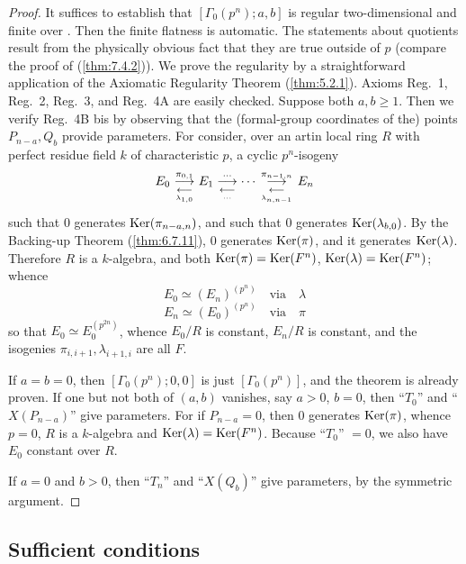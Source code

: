 \begin{proof}
It suffices to establish that $[\Gamma_0(p^n); a, b]$ is regular two-dimensional and finite over \Ell. Then the finite flatness is automatic. The statements about quotients result from the physically obvious fact that they are true outside of $p$ (compare the proof of (\ref{thm:7.4.2})). We prove the regularity by a straightforward application of the Axiomatic Regularity Theorem (\ref{thm:5.2.1}). Axioms Reg.~1, Reg.~2, Reg.~3, and Reg.~4A are easily checked. Suppose both $a, b \geq 1$. Then we verify Reg.~4B bis by observing that the (formal-group coordinates of the) points $P_{n-a}, Q_b$ provide parameters. For consider, over an artin local ring $R$ with perfect residue field $k$ of characteristic $p$, a cyclic $p^n$-isogeny
\[
E_0 \mathrel{ \mathop{\overset{\,\pi_{0,1}\,}{\longrightarrow}} \limits_{\underset{\,\lambda_{1,0}\,}{\longleftarrow}} } E_1 \mathrel{ \mathop{\overset{\,\cdots\,}{\longrightarrow}} \limits_{\underset{\,\cdots\,}{\longleftarrow}} } \cdots \mathrel{ \mathop{\overset{\,\pi_{n-1,n}\,}{\longrightarrow}} \limits_{\underset{\,\lambda_{n,n-1}\,}{\longleftarrow}} } E_n
\]
such that $0$ generates $\operatorname{Ker}(\pi_{n-a,n})$, and such that $0$ generates $\operatorname{Ker}(\lambda_{b,0})$. By the Backing-up Theorem (\ref{thm:6.7.11}), $0$ generates $\operatorname{Ker}(\pi)$, and it generates $\operatorname{Ker}(\lambda)$. Therefore $R$ is a $k$-algebra, and both $\operatorname{Ker}(\pi) = \operatorname{Ker}(F^n)$, $\operatorname{Ker}(\lambda) = \operatorname{Ker}(F^n)$; whence
\[
E_0 \simeq (E_n)^{(p^n)} \quad \text{via} \quad \lambda
\]
\[
E_n \simeq (E_0)^{(p^n)} \quad \text{via} \quad \pi
\]
so that $E_0 \simeq E_0^{(p^{2n})}$, whence $E_0/R$ is constant, $E_n/R$ is constant, and the isogenies $\pi_{i,i+1}, \lambda_{i+1,i}$ are all $F$.

If $a = b = 0$, then $[\Gamma_0(p^n); 0, 0]$ is just $[\Gamma_0(p^n)]$, and the theorem is already proven. If one but not both of $(a,b)$ vanishes, say $a > 0$, $b = 0$, then ``$T_0$'' and ``$X(P_{n-a})$'' give parameters. For if $P_{n-a} = 0$, then $0$ generates $\operatorname{Ker}(\pi)$, whence $p = 0$, $R$ is a $k$-algebra and $\operatorname{Ker}(\lambda) = \operatorname{Ker}(F^n)$. Because ``$T_0$'' $= 0$, we also have $E_0$ constant over $R$.

If $a = 0$ and $b > 0$, then ``$T_n$'' and ``$X(Q_b)$'' give parameters, by the symmetric argument.
\end{proof}


\label{sec:A.7}

\subsection{Sufficient conditions}

